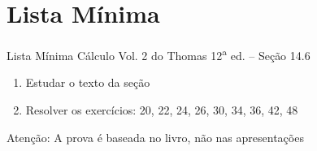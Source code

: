 

\section{Lista Mínima}

\begin{frame}{Lista Mínima}
  Cálculo Vol. 2 do Thomas 12\textsuperscript{a} ed. -- Seção 14.6
  \begin{enumerate}
    \item Estudar o texto da seção
    \item Resolver os exercícios: 20, 22, 24, 26, 30, 34, 36, 42, 48
  \end{enumerate}

  \vfill
  Atenção: A prova é baseada no livro, não nas apresentações
\end{frame}


